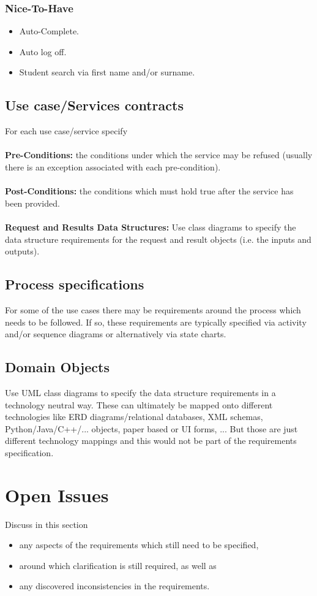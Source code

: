 \documentclass[11pt,a4paper]{article}
\begin{document}
\subsubsection{Nice-To-Have} 
\begin{itemize}
\item Auto-Complete.
\item Auto log off.
\item Student search via first name and/or surname.
\end{itemize}

\subsection{Use case/Services contracts}
For each use case/service specify
\\\\
\textbf{Pre-Conditions: }the conditions under which the service may be refused (usually there is an exception associated with each pre-condition).
\\\\
\textbf{Post-Conditions: }the conditions which must hold true after the service has been provided.
\\\\
\textbf{Request and Results Data Structures: }Use class diagrams to specify the data structure requirements for the request and result objects (i.e. the inputs and outputs).
\subsection{Process specifications}
For some of the use cases there may be requirements around the process which needs to be followed. If so, these requirements are typically specified via activity and/or sequence diagrams or
alternatively via state charts.
\subsection{Domain Objects}
Use UML class diagrams to specify the data structure requirements in a technology neutral way. These can ultimately be mapped onto different technologies like ERD diagrams/relational databases, XML schemas, Python/Java/C++/... objects, paper based or UI forms, ... But those are just different technology mappings and this would not be part of the requirements specification.
\section{Open Issues}
Discuss in this section
\begin{itemize}
\item any aspects of the requirements which still need to be specified,
\item around which clarification is still required, as well as
\item any discovered inconsistencies in the requirements.
\end{itemize}
\end{document}
